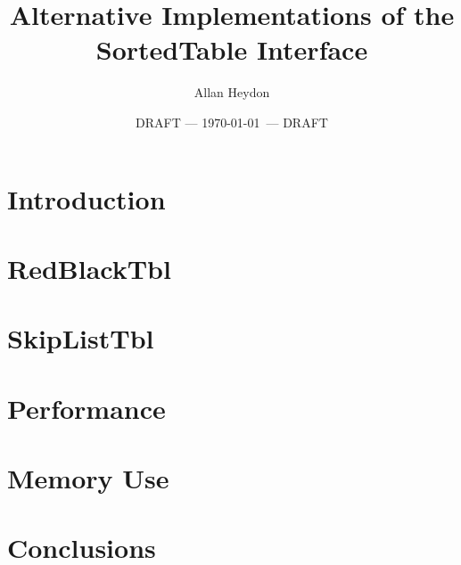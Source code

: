 \documentclass{article}
\begin{document}


\title{Alternative Implementations of the SortedTable Interface}
\author{Allan Heydon}
\date{DRAFT --- \today\ --- DRAFT}
\maketitle

\section{Introduction}


\section{RedBlackTbl}


\section{SkipListTbl}


\section{Performance}


\section{Memory Use}


\section{Conclusions}



\end{document}
